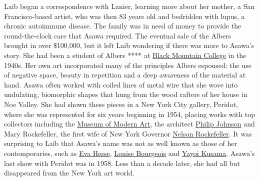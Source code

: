 Laib began a correspondence with Lanier, learning more about her mother,
a San Francisco-based artist, who was then 83 years old and bedridden
with lupus, a chronic autoimmune disease. The family was in need of
money to provide the round-the-clock care that Asawa required. The
eventual sale of the Albers brought in over \$100,000, but it left Laib
wondering if there was more to Asawa's story. She had been a student of
Albers **** at
\href{https://www.nytimes.com/2015/03/19/arts/artsspecial/in-the-spirit-of-black-mountain-college-an-avant-garde-incubator.html}{Black
Mountain College} in the 1940s. Her own art incorporated many of the
principles Albers espoused: the use of negative space, beauty in
repetition and a deep awareness of the material at hand. Asawa often
worked with coiled lines of metal wire that she wove into undulating,
biomorphic shapes that hung from the wood rafters of her house in Noe
Valley. She had shown these pieces in a New York City gallery, Peridot,
where she was represented for six years beginning in 1954, placing works
with top collectors including the
\href{https://www.nytimes.com/topic/organization/museum-of-modern-art}{Museum
of Modern Art}, the architect
\href{https://www.nytimes.com/2017/03/23/t-magazine/philip-johnson-rockefeller-guest-house-manhattan.html}{Philip
Johnson} and Mary Rockefeller, the first wife of New York Governor
\href{https://www.nytimes.com/1964/02/16/archives/political-evolution-of-nelson-rockefeller-in-less-than-six-years-he.html}{Nelson
Rockefeller}. It was surprising to Laib that Asawa's name was not as
well known as those of her contemporaries, such as
\href{https://tmagazine.blogs.nytimes.com/2010/03/25/just-looking-eva-hesse/}{Eva
Hesse},
\href{https://www.nytimes.com/2016/10/03/t-magazine/art/louise-bourgeois-turning-inwards.html}{Louise
Bourgeois} and
\href{https://www.nytimes.com/2016/09/01/t-magazine/art/yayoi-kusama-glass-house.html}{Yayoi
Kusama}. Asawa's last show with Peridot was in 1958. Less than a decade
later, she had all but disappeared from the New York art world.

